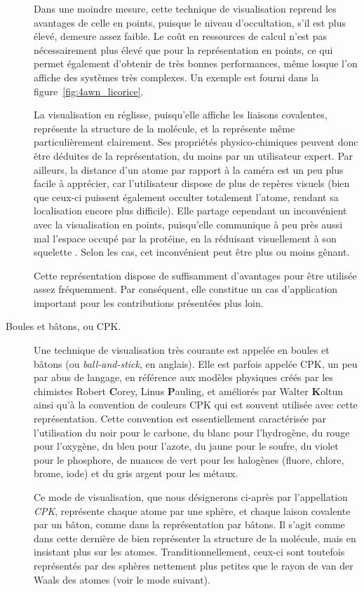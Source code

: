 \begin{description}
		Dans une moindre mesure, cette technique de visualisation reprend les avantages de celle en points, puisque le niveau d'occultation, s'il est plus élevé, demeure assez faible. Le coût en ressources de calcul n'est pas nécessairement plus élevé que pour la représentation en points, ce qui permet également d'obtenir de très bonnes performances, même losque l'on affiche des systèmes très complexes. Un exemple est fourni dans la figure~\ref{fig:4awn_licorice}.
		
		La visualisation en réglisse, puisqu'elle affiche les liaisons covalentes, représente la structure de la molécule, et la représente même particulièrement clairement. Ses propriétés physico-chimiques peuvent donc être déduites de la représentation, du moins par un utilisateur expert. Par ailleurs, la distance d'un atome par rapport à la caméra est un peu plus facile à apprécier, car l'utilisateur dispose de plus de repères visuels (bien que ceux-ci puissent également occulter totalement l'atome, rendant sa localisation encore plus difficile). Elle partage cependant un inconvénient avec la visualisation en points, puisqu'elle communique à peu près aussi mal l'espace occupé par la protéine, en la réduisant visuellement à son \og squelette \fg{}. Selon les cas, cet inconvénient peut être plus ou moins gênant.
		
		Cette représentation dispose de suffisamment d'avantages pour être utilisée assez fréquemment. Par conséquent, elle constitue un cas d'application important pour les contributions présentées plus loin.
		
		\item[Boules et bâtons, ou CPK.] Une technique de visualisation très courante est appelée \og en boules et bâtons \fg{} (ou \emph{ball-and-stick}, en anglais). Elle est parfois appelée CPK, un peu par abus de langage, en référence aux modèles physiques créés par les chimistes Robert \textbf{C}orey, Linus \textbf{P}auling, et améliorés par Walter \textbf{K}oltun~\cite{corey1953molecular, koltun1965space} ainsi qu'à la convention de couleurs CPK qui est souvent utilisée avec cette représentation. Cette convention est essentiellement caractérisée par l'utilisation du noir pour le carbone, du blanc pour l'hydrogène, du rouge pour l'oxygène, du bleu pour l'azote, du jaune pour le soufre, du violet pour le phosphore, de nuances de vert pour les halogènes (fluore, chlore, brome, iode) et du gris argent pour les métaux.
		
		Ce mode de visualisation, que nous désignerons ci-après par l'appellation \emph{CPK}, représente chaque atome par une sphère, et chaque laison covalente par un bâton, comme dans la représentation par bâtons. Il s'agit comme dans cette dernière de bien représenter la structure de la molécule, mais en insistant plus sur les atomes. Tranditionnellement, ceux-ci sont toutefois représentés par des sphères nettement plus petites que le rayon de van der Waals des atomes (voir le mode suivant).
		

\end{description}
